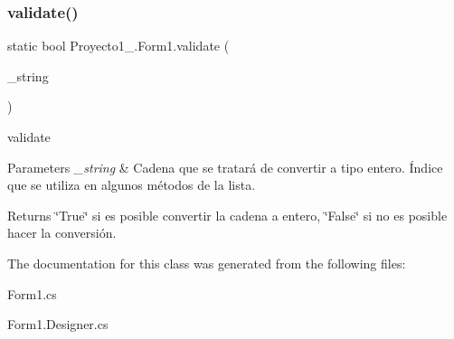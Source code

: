 \subsubsection{\texorpdfstring{validate()}{validate()}}
{\footnotesize\ttfamily static bool Proyecto1\+\_.\+Form1.\+validate (\begin{DoxyParamCaption}\item[{string}]{\+\_\+string }\end{DoxyParamCaption})\hspace{0.3cm}{\ttfamily [static]}}



validate 


\begin{DoxyParams}{Parameters}
{\em \+\_\+string} & Cadena que se tratará de convertir a tipo entero. Índice que se utiliza en algunos métodos de la lista.\\
\hline
\end{DoxyParams}
\begin{DoxyReturn}{Returns}
\char`\"{}\+True\char`\"{} si es posible convertir la cadena a entero, \char`\"{}\+False\char`\"{} si no es posible hacer la conversión.
\end{DoxyReturn}


The documentation for this class was generated from the following files\+:\begin{DoxyCompactItemize}
\item 
Form1.\+cs\item 
Form1.\+Designer.\+cs\end{DoxyCompactItemize}

